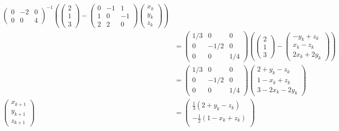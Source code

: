 {\begin{align*}
\begin{pmatrix}
0 & -2 &  0 \\
0 &  0 &  4 
\end{pmatrix}^{-1}
\left(
\begin{pmatrix}
2 \\
1 \\
3
\end{pmatrix} 
- 
\begin{pmatrix}
0 & -1 &  1 \\
1 &  0 & -1 \\
2 &  2 &  0 
\end{pmatrix}
\begin{pmatrix}
x_{k} \\
y_{k} \\
z_{k}
\end{pmatrix}
\right)
\\
&= 
\begin{pmatrix}
1/3 &  0 &  0 \\
0 & -1/2 &  0 \\
0 &  0 &  1/4 
\end{pmatrix}
\left(
\begin{pmatrix}
2 \\
1 \\
3
\end{pmatrix} 
- 
\begin{pmatrix}
-y_{k} + z_{k} \\
x_{k} - z_{k}  \\
2x_{k} + 2y_{k}
\end{pmatrix}
\right)
\\
&= 
\begin{pmatrix}
1/3 &  0 &  0 \\
0 & -1/2 &  0 \\
0 &  0 &  1/4 
\end{pmatrix}
\begin{pmatrix}
2 +y_{k} - z_{k} \\
1 - x_{k} + z_{k}  \\
3 - 2x_{k} - 2y_{k}
\end{pmatrix}
\\
\begin{pmatrix}
x_{k+1} \\
y_{k+1} \\
z_{k+1}
\end{pmatrix} 
&= 
\begin{pmatrix}
\frac{1}{3}\left(2 +y_{k} - z_{k} \right)\\
-\frac{1}{2}\left(1 - x_{k} + z_{k} \right)  \\

\end{pmatrix}
\end{align*}}
